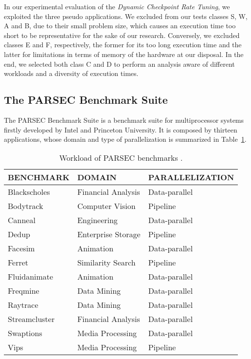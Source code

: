 In our experimental evaluation of the \emph{Dynamic Checkpoint Rate Tuning}, we exploited the three pseudo applications. We excluded from our tests classes S, W, A and B, due to their small problem size, which causes an execution time too short to be representative for the sake of our research. Conversely, we excluded classes E and F, respectively, the former for its too long execution time and the latter for limitations in terms of memory of the hardware at our disposal. In the end, we selected both class C and D to perform an analysis aware of different workloads and a diversity of execution times. 

\subsection{The PARSEC Benchmark Suite}
The PARSEC Benchmark Suite \cite{7849432} is a benchmark suite for multiprocessor systems firstly developed by Intel and Princeton University. It is composed by thirteen applications, whose domain and type of parallelization is summarized in Table~\ref{tab:parsec}.

\begin{table}
    \centering
    \begin{tabular}{|l|l|l|}
    \hline
    \rowcolor{lightblue}\textbf{BENCHMARK} & \textbf{DOMAIN} & \textbf{PARALLELIZATION}\\
    \hline
        \rowcolor{odd}Blackscholes & Financial Analysis & Data-parallel\\
        \rowcolor{even}Bodytrack & Computer Vision & Pipeline \\
        \rowcolor{odd}Canneal & Engineering & Data-parallel  \\
        \rowcolor{even}Dedup & Enterprise Storage & Pipeline  \\
        \rowcolor{odd}Facesim & Animation & Data-parallel \\
        \rowcolor{even}Ferret & Similarity Search & Pipeline \\
        \rowcolor{odd}Fluidanimate & Animation & Data-parallel \\
        \rowcolor{even}Freqmine & Data Mining & Data-parallel \\
        \rowcolor{odd}Raytrace & Data Mining & Data-parallel \\
        \rowcolor{even}Streamcluster & Financial Analysis & Data-parallel \\
        \rowcolor{odd}Swaptions & Media Processing & Data-parallel \\
        \rowcolor{even}Vips & Media Processing & Pipeline \\
        \hline
    \end{tabular}
    \caption{Workload of PARSEC benchmarks \cite{princetonuniversity}.}
    \label{tab:parsec}
\end{table}

